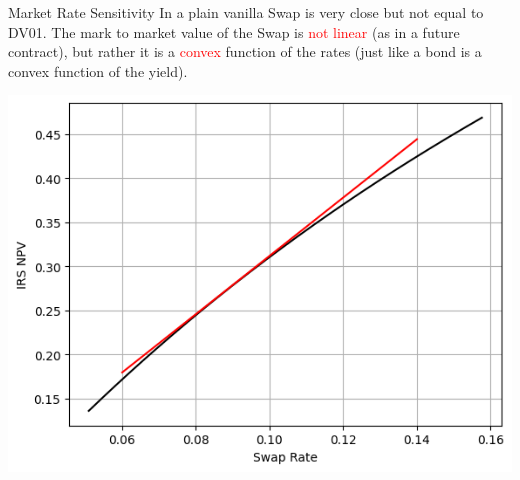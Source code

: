 \documentclass{beamer}
\begin{document}
\begin{frame}{Market Rate Sensitivity}
In a plain vanilla Swap is very close but not equal to DV01. The mark to market value of the Swap is \textcolor{red}{not linear} (as in a future contract), but rather it is a \textcolor{red}{convex} function of the rates (just like a bond is a convex function of the yield).
\begin{center}
\includegraphics[width=0.5\linewidth]{dv01}
\end{center}
\end{frame}

\end{document}
